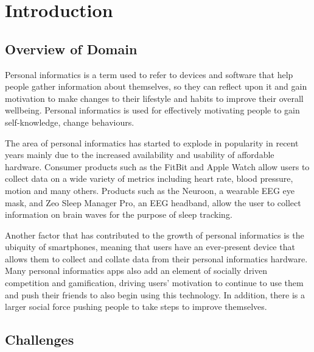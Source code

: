 \section{Introduction}

\subsection{Overview of Domain}


Personal informatics is a term used to refer to devices and software that help people gather
information about themselves, so they can reflect upon it and gain motivation to make changes to
their lifestyle and habits to improve their overall wellbeing. Personal informatics is used for
effectively motivating people to gain self-knowledge, change behaviours. %

The area of personal informatics has started to explode in popularity in recent years mainly due to
the increased availability and usability of affordable hardware. Consumer products such as the
FitBit and Apple Watch allow users to collect data on a wide variety of metrics including heart
rate, blood pressure, motion and many others. Products such as the Neuroon, a wearable EEG eye mask,
and Zeo Sleep Manager Pro, an EEG headband, allow the user to collect information on brain waves for
the purpose of sleep tracking.


Another factor that has contributed to the growth of personal informatics is the ubiquity of
smartphones, meaning that users have an ever-present device that allows them to collect and collate
data from their personal informatics hardware. Many personal informatics apps also add an element of
socially driven competition and gamification, driving users' motivation to continue to use them and
push their friends to also begin using this technology. In addition, there is a larger social force
pushing people to take steps to improve themselves. %


\subsection{Challenges}

